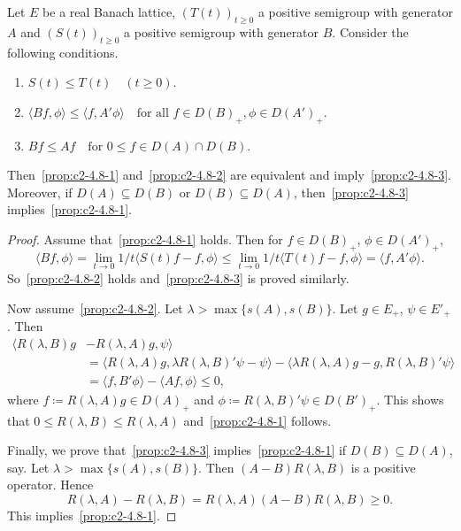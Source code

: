 \begin{proposition}\label{prop:c2-4.8}
Let $E$ be a real Banach lattice, $(T(t))_{t \geq 0}$ a
positive semigroup with generator $A$ and $(S(t))_{t \geq 0}$ a positive
semigroup with generator $B$. Consider the following conditions.
\begin{enumerate}[\upshape (a)]
\item \label{prop:c2-4.8-1}
$S(t) \leq T(t) \quad (t \geq 0)$.
\item \label{prop:c2-4.8-2}
$\langle Bf,\phi\rangle \leq \langle f,A'\phi\rangle \quad \text{for all } f \in D(B)_{+}, \phi \in D(A')_{+}$.
\item \label{prop:c2-4.8-3}
$Bf \leq Af \quad \text{for } 0 \leq f \in D(A) \cap D(B)$.
\end{enumerate}
Then~\ref{prop:c2-4.8-1} and~\ref{prop:c2-4.8-2}  are equivalent and imply~\ref{prop:c2-4.8-3}.
Moreover, if\/ $D(A) \subseteq D(B)$ or $D(B) \subseteq D(A)$, then~\ref{prop:c2-4.8-3}   implies~\ref{prop:c2-4.8-1}.
\end{proposition}
\begin{proof}
Assume that~\ref{prop:c2-4.8-1}   holds. 
Then for $f \in D(B)_{+}$, $\phi \in D(A')_{+}$,
\begin{equation*}
\langle Bf,\phi\rangle = \lim_{t \to 0} 1/t \langle S(t)f - f, \phi\rangle \leq \lim_{t \to 0} 1/t \langle T(t)f - f, \phi\rangle 
= \langle f, A'\phi\rangle.
\end{equation*}
So~\ref{prop:c2-4.8-2}   holds and~\ref{prop:c2-4.8-3}   is proved similarly.

Now assume~\ref{prop:c2-4.8-2}. 
Let $\lambda > \max \{s(A), s(B)\}$. Let $g \in E_{+}$, $\psi \in E'_{+}$.
Then 
\begin{align*}
\langle R(\lambda,B)g &- R(\lambda,A)g, \psi\rangle\\
&= \langle R(\lambda,A)g, \lambda R(\lambda,B)'\psi - \psi\rangle - \langle \lambda R(\lambda,A)g - g, R(\lambda,B)'\psi\rangle\\
&= \langle f, B'\phi\rangle - \langle Af, \phi\rangle \leq 0,
\end{align*}
where $f \coloneq R(\lambda,A)g \in D(A)_{+}$ and $\phi \coloneq R(\lambda,B)'\psi \in D(B')_{+}$. 
This shows that $0 \leq R(\lambda,B) \leq R(\lambda,A)$ and~\ref{prop:c2-4.8-1}   follows.

Finally, we prove that~\ref{prop:c2-4.8-3}   implies~\ref{prop:c2-4.8-1}   if\/ $D(B) \subseteq D(A)$, say.
Let $\lambda > \max\{s(A),s(B)\}$. 
Then $(A - B)R(\lambda,B)$ is a positive operator.
Hence 
\[
R(\lambda,A) - R(\lambda,B) = R(\lambda,A)(A - B)R(\lambda,B) \geq 0 .
\]
This implies~\ref{prop:c2-4.8-1}.
\end{proof}
